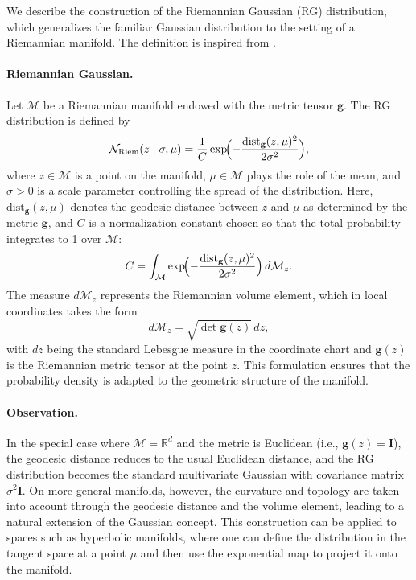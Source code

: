 We describe the construction of the Riemannian Gaussian (RG) distribution, which generalizes the familiar Gaussian distribution to the setting of a Riemannian manifold. The definition is inspired from \citet{pennec2006intrinsic}.

\paragraph{Riemannian Gaussian.} Let $\mathcal{M}$ be a Riemannian manifold endowed with the metric tensor $\mathbf{g}$. The RG distribution is defined by
\[
\mathcal{N}_{\text{Riem}}(z \mid \sigma, \mu) 
= \frac{1}{C} \exp\!\Bigl(-\frac{\text{dist}_{\mathbf{g}}(z, \mu)^2}{2\sigma^2}\Bigr),
\]
where $z\in\mathcal{M}$ is a point on the manifold, $\mu\in\mathcal{M}$ plays the role of the mean, and $\sigma>0$ is a scale parameter controlling the spread of the distribution. Here, $\text{dist}_{\mathbf{g}}(z, \mu)$ denotes the geodesic distance between $z$ and $\mu$ as determined by the metric $\mathbf{g}$, and $C$ is a normalization constant chosen so that the total probability integrates to 1 over $\mathcal{M}$:
\[
C = \int_{\mathcal{M}} \exp\!\Bigl(-\frac{\text{dist}_{\mathbf{g}}(z, \mu)^2}{2\sigma^2}\Bigr)\, d\mathcal{M}_z.
\]
The measure $d\mathcal{M}_z$ represents the Riemannian volume element, which in local coordinates takes the form
\[
d\mathcal{M}_z = \sqrt{\det \mathbf{g}(z)}\, dz,
\]
with $dz$ being the standard Lebesgue measure in the coordinate chart and $\mathbf{g}(z)$ is the Riemannian metric tensor at the point $z$. This formulation ensures that the probability density is adapted to the geometric structure of the manifold.

\paragraph{Observation.} In the special case where $\mathcal{M} = \mathbb{R}^d$ and the metric is Euclidean (i.e., $\mathbf{g}(z) = \mathbf{I}$), the geodesic distance reduces to the usual Euclidean distance, and the RG distribution becomes the standard multivariate Gaussian with covariance matrix $\sigma^2\mathbf{I}$. On more general manifolds, however, the curvature and topology are taken into account through the geodesic distance and the volume element, leading to a natural extension of the Gaussian concept. This construction can be applied to spaces such as hyperbolic manifolds, where one can define the distribution in the tangent space at a point $\mu$ and then use the exponential map to project it onto the manifold.

